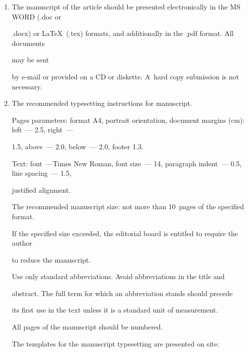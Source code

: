{\begin{enumerate}[1.]
\item The manuscript of the article should be presented electronically in the MS WORD (.doc or


.docx) or \LaTeX\ (.tex) formats, and additionally in the .pdf format. All documents


 may be sent


by e-mail or provided on a CD or diskette. A~hard copy submission is not necessary.\\[-13.5pt]





\item The recommended typesetting instructions for manuscript.





Pages parameters: format A4, portrait orientation, document margins (cm): left~--- 2.5, right~---


1.5, above~--- 2.0, below~--- 2.0, footer 1.3.





Text: font~---Times New Roman, font size~--- 14, paragraph indent~--- 0.5, line spacing~--- 1.5,


justified alignment.





The recommended manuscript size: not more than 10~pages of the specified format.


If the specified size exceeded, the editorial board is entitled to require the author


to reduce the manuscript.





Use only standard abbreviations. Avoid  abbreviations in the title and


abstract. The full term for which an abbreviation stands should precede


its first use in the text unless it is a standard unit of measurement.





All pages of the manuscript should be numbered.





The templates for the manuscript typesetting are presented on site: 






\end{enumerate}}
